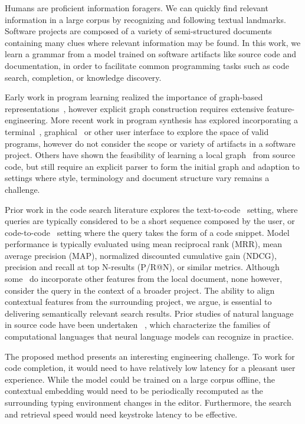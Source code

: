 \documentclass[10pt]{article}
\begin{document}
Humans are proficient information foragers. We can quickly find relevant information in a large corpus by recognizing and following textual landmarks. Software projects are composed of a variety of semi-structured documents containing many clues where relevant information may be found. In this work, we learn a grammar from a model trained on software artifacts like source code and documentation, in order to facilitate common programming tasks such as code search, completion, or knowledge discovery.

Early work in program learning realized the importance of graph-based representations~\cite{allamanis2017learning}, however explicit graph construction requires extensive feature-engineering. More recent work in program synthesis has explored incorporating a terminal~\cite{ellis2019write}, graphical~\cite{walke2020learning} or other user interface to explore the space of valid programs, however do not consider the scope or variety of artifacts in a software project. Others have shown the feasibility of learning a local graph~\cite{johnson2020learning} from source code, but still require an explicit parser to form the initial graph and adaption to settings where style, terminology and document structure vary remains a challenge.

Prior work in the code search literature explores the text-to-code~\cite{husain2019codesearchnet} setting, where queries are typically considered to be a short sequence composed by the user, or code-to-code~\cite{kim2018facoy} setting where the query takes the form of a code snippet. Model performance is typically evaluated using mean reciprocal rank (MRR), mean average precision (MAP), normalized discounted cumulative gain (NDCG), precision and recall at top N-results (P/R@N), or similar metrics. Although some~\cite{asyrofi2020ausearch} do incorporate other features from the local document, none however, consider the query in the context of a broader project. The ability to align contextual features from the surrounding project, we argue, is essential to delivering semantically relevant search results. Prior studies of natural language in source code have been undertaken ~\cite{weiss2018practical, chirkova2020empirical, chen2021evaluating}, which characterize the families of computational languages that neural language models can recognize in practice.

The proposed method presents an interesting engineering challenge. To work for code completion, it would need to have relatively low latency for a pleasant user experience. While the model could be trained on a large corpus offline, the contextual embedding would need to be periodically recomputed as the surrounding typing environment changes in the editor. Furthermore, the search and retrieval speed would need keystroke latency to be effective.
\end{document}

